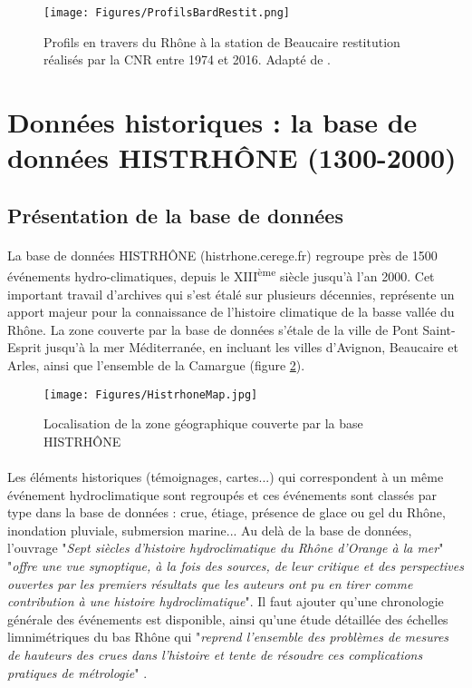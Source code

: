 \documentclass[11pt]{article}
\begin{document}
	\begin{figure}[h]
	\centering
		\texttt{[image: Figures/ProfilsBardRestit.png]}
        \caption{Profils en travers du Rhône à la station de Beaucaire restitution réalisés par la CNR entre 1974 et 2016. Adapté de \cite{bard_actualisation_2018}.}	
		\label{fig:ProfilsRestit}
	\end{figure}
	
       
\FloatBarrier


\section{Données historiques : la base de données HISTRHÔNE (1300-2000)}

	\subsection{Présentation de la base de données}

	\paragraph{} La base de données HISTRHÔNE (histrhone.cerege.fr) \citep{pichard_sept_2014} regroupe près de 1500 événements hydro-climatiques, depuis le XIII\textsuperscript{ème} siècle jusqu'à l'an 2000. Cet important travail d'archives qui s'est étalé sur plusieurs décennies, représente un apport majeur pour la connaissance de l'histoire climatique de la basse vallée du Rhône. La zone couverte par la base de données s'étale de la ville de Pont Saint-Esprit jusqu'à la mer Méditerranée, en incluant les villes d'Avignon, Beaucaire et Arles, ainsi que l'ensemble de la Camargue (figure \ref{fig:MapHistrhone}). 
	
	\begin{figure}[h]
	\centering
		\texttt{[image: Figures/HistrhoneMap.jpg]}
        \caption{Localisation de la zone géographique couverte par la base HISTRHÔNE \citep{pichard_sept_2014} }
		\label{fig:MapHistrhone}
	\end{figure}
	
	\paragraph{} Les éléments historiques (témoignages, cartes...) qui correspondent à un même événement hydroclimatique sont regroupés et ces événements sont classés par type dans la base de données : crue, étiage, présence de glace ou gel du Rhône, inondation pluviale, submersion marine... Au delà de la base de données, l'ouvrage "\textit{Sept siècles d'histoire hydroclimatique du Rhône d'Orange à la mer}" \citep{pichard_sept_2014} "\textit{offre une vue synoptique, à la fois des sources, de leur critique et des perspectives ouvertes par les premiers résultats que les auteurs ont pu en tirer comme contribution à une histoire hydroclimatique}". Il faut ajouter qu'une chronologie générale des événements est disponible, ainsi qu'une étude détaillée des échelles limnimétriques du bas Rhône qui "\textit{reprend l'ensemble des problèmes de mesures de hauteurs des crues dans l'histoire et tente de résoudre ces complications pratiques de métrologie}" \citep{pichard_hauteurs_2013} .
	
\end{document}

